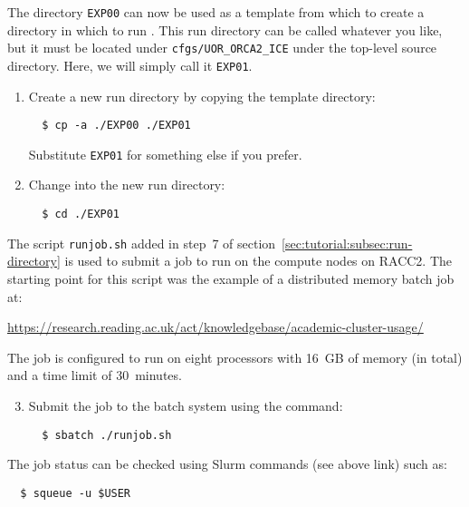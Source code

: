 The directory \verb|EXP00| can now be used as a template from which to create a directory in which to run \NEMOSIcu{}.
This run directory can be called whatever you like, but it must be located under \verb|cfgs/UOR_ORCA2_ICE| under the top-level source directory.
Here, we will simply call it \verb|EXP01|. 

\begin{enumerate}
    \item Create a new run directory by copying the template directory:

\begin{verbatim}
  $ cp -a ./EXP00 ./EXP01
\end{verbatim}

    Substitute \verb|EXP01| for something else if you prefer.

    \item Change into the new run directory:

\begin{verbatim}
  $ cd ./EXP01
\end{verbatim}

\end{enumerate}

The script \verb|runjob.sh| added in step~7 of section~\ref{sec:tutorial:subsec:run-directory} is used to submit a job to run \NEMOSIcu{} on the compute nodes on RACC2.
The starting point for this script was the example of a distributed memory batch job at:

\begin{center}
    \small
    \url{https://research.reading.ac.uk/act/knowledgebase/academic-cluster-usage/}
\end{center}

The job is configured to run on eight processors with 16~GB of memory (in total) and a time limit of 30~minutes.

\begin{enumerate}\setcounter{enumi}{2}
    \item Submit the job to the batch system using the command:

\begin{verbatim}
  $ sbatch ./runjob.sh
\end{verbatim}

\end{enumerate}

The job status can be checked using Slurm commands (see above link) such as:

\begin{verbatim}
  $ squeue -u $USER
\end{verbatim}

